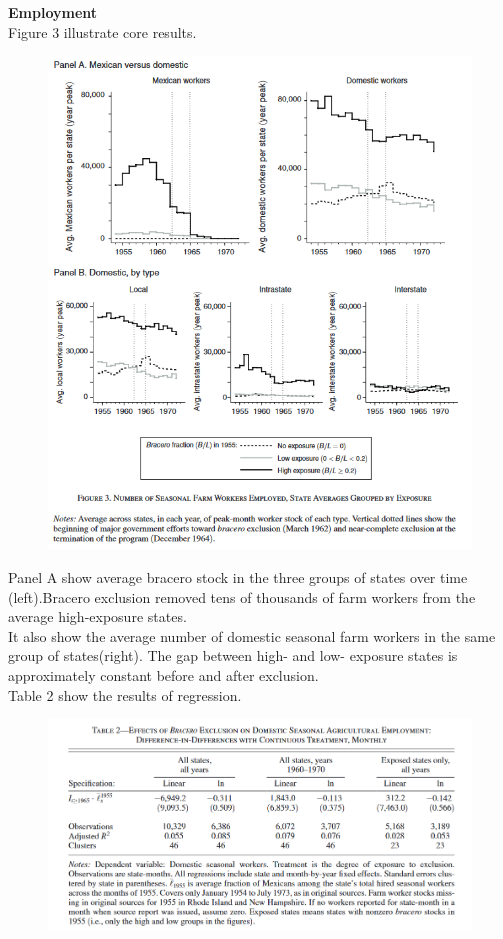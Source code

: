 \documentclass[../root]{subfiles}
\begin{document}
    {\bf Employment}\\
    Figure 3 illustrate core results.
    \begin{figure}
        \centering
        \includegraphics[width = \linewidth]{0731sugiyama/Figure3.png}
        \label{fig:my_label}
    \end{figure}
    Panel A show average bracero stock in the three groups of states over time (left).Bracero exclusion removed tens of thousands of farm workers from the average high-exposure states. \\
    It also show the average number of domestic seasonal farm workers in the same group of states(right).   The gap between high- and low- exposure states is approximately constant before and after exclusion.  \\
    Table 2 show the results of regression.
    \begin{figure}
        \centering
        \includegraphics[width = \linewidth]{0731sugiyama/Table2.png}
        \label{fig:my_label}
    \end{figure}
\end{document}
